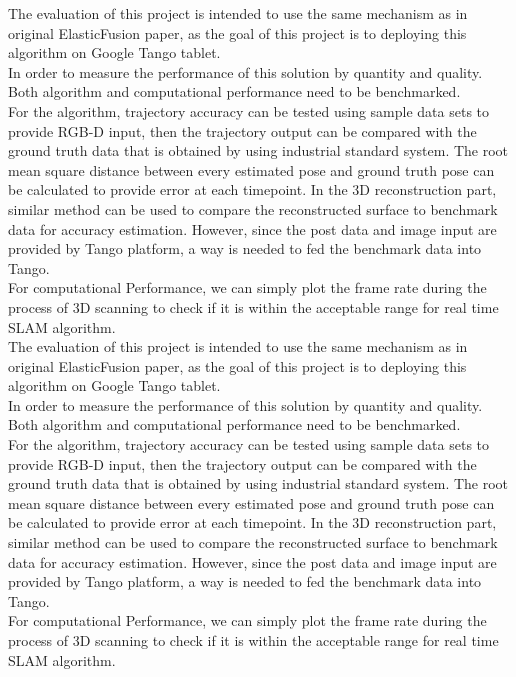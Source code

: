 \documentclass[12pt,twoside]{article}
\begin{document}
​The evaluation of this project is intended to use the same mechanism as in original ElasticFusion\citep{whelan2016elasticfusion} paper, as the goal of this project is to deploying this algorithm on Google Tango tablet.\\
In order to measure the performance of this solution by quantity and quality. Both algorithm and computational performance need to be benchmarked.\\
For the algorithm, trajectory accuracy can be tested using sample data sets to provide RGB-D input, then the trajectory output can be compared with the ground truth data that is obtained by using industrial standard system. The root mean square distance between every estimated pose and ground truth pose can be calculated to provide error at each timepoint. In the 3D reconstruction part, similar method can be used to compare the reconstructed surface to benchmark data for accuracy estimation. However, since the post data and image input are provided by Tango platform, a way is needed to fed the benchmark data into Tango.\\
For computational Performance, we can simply plot the frame rate during the process of 3D scanning to check if it is within the acceptable range for real time SLAM algorithm.\\
​The evaluation of this project is intended to use the same mechanism as in original ElasticFusion\citep{whelan2016elasticfusion} paper, as the goal of this project is to deploying this algorithm on Google Tango tablet.\\
In order to measure the performance of this solution by quantity and quality. Both algorithm and computational performance need to be benchmarked.\\
For the algorithm, trajectory accuracy can be tested using sample data sets to provide RGB-D input, then the trajectory output can be compared with the ground truth data that is obtained by using industrial standard system. The root mean square distance between every estimated pose and ground truth pose can be calculated to provide error at each timepoint. In the 3D reconstruction part, similar method can be used to compare the reconstructed surface to benchmark data for accuracy estimation. However, since the post data and image input are provided by Tango platform, a way is needed to fed the benchmark data into Tango.\\
For computational Performance, we can simply plot the frame rate during the process of 3D scanning to check if it is within the acceptable range for real time SLAM algorithm.
\end{document}
